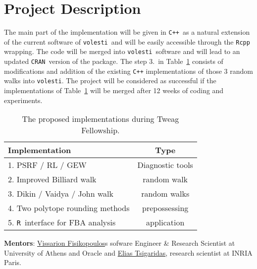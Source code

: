 \documentclass[a4paper, 12pt]{article}
\def \c++{{\tt C++}}
\def\volesti{{\tt volesti}}
\def\cran{{\tt CRAN}}
\def\R{{\tt R}}
\begin{document}
\section{Project Description}
The main part of the implementation will be given in \c++\ as a natural extension of the current software of \volesti\ and will be easily accessible through the {\tt Rcpp} wrapping. The code will be merged into \volesti\ software and will lead to an updated \cran\ version of the package. The step 3.\ in Table~\ref{tab:impmeth} consists of modifications and addition of the existing {\tt C++} implementations of those $3$ random walks into \volesti. The project will be considered as successful if the implementations of Table~\ref{tab:impmeth} will be merged after 12 weeks of coding and experiments. %

\begin{table}[h!]
\centering
\begin{tabular}{|l|c|}
\hline
\hspace{1.6cm} Implementation & Type \\ \hline%
1. PSRF / RL / GEW & Diagnostic tools \\ \hline%
2. Improved Billiard walk & random walk \\ \hline%
3. Dikin / Vaidya / John walk & random walks \\ \hline%
4. Two polytope rounding methods & prepossessing \\ \hline%
5. \R\ interface for FBA analysis & application \\ \hline%
\end{tabular}
\caption{\label{tab:impmeth} The proposed implementations during Tweag Fellowship.}
\end{table}

\textbf{Mentors}: \textcolor{blue}{\href{https://vissarion.github.io/}{Vissarion Fisikopoulos}}s sofware Engineer \& Research Scientist at University of Athens and Oracle and %
\textcolor{blue}{\href{https://who.paris.inria.fr/Elias.Tsigaridas/}{Elias Tsigaridas}}, research scientist at INRIA Paris.%
\end{document}
